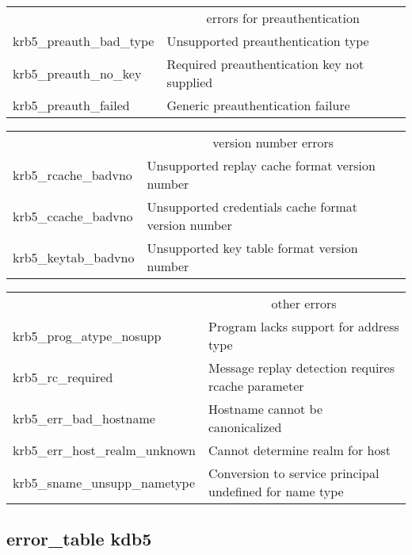 \begin{small}
\begin{tabular}{ll}
\end{tabular}

\begin{tabular}{ll}
&\multicolumn{1}{c}{errors for preauthentication} \\

{\sc krb5_preauth_bad_type }& Unsupported preauthentication type \\
{\sc krb5_preauth_no_key }&	 Required preauthentication key not supplied \\
{\sc krb5_preauth_failed }&	 Generic preauthentication failure \\

\end{tabular}

\begin{tabular}{ll}
&\multicolumn{1}{c}{version number errors} \\

{\sc krb5_rcache_badvno }& Unsupported replay cache format version number \\
{\sc krb5_ccache_badvno }& Unsupported credentials cache format version number \\
{\sc krb5_keytab_badvno }& Unsupported key table format version number \\

\end{tabular}

\begin{tabular}{ll}
&\multicolumn{1}{c}{other errors} \\ 

{\sc krb5_prog_atype_nosupp }& Program lacks support for address type \\
{\sc krb5_rc_required }& Message replay detection requires rcache parameter \\
{\sc krb5_err_bad_hostname }& Hostname cannot be canonicalized \\
{\sc krb5_err_host_realm_unknown }& Cannot determine realm for host \\
{\sc krb5_sname_unsupp_nametype }& Conversion to service principal undefined for name type \\
\end{tabular}
\end{small}

\subsection{error_table kdb5}


